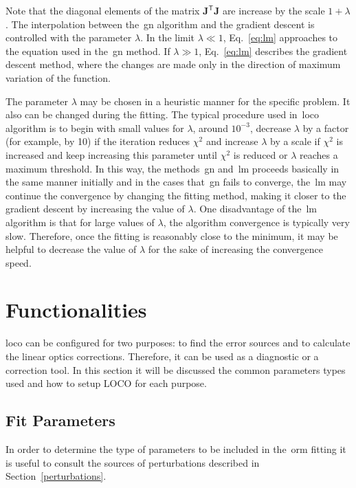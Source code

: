 Note that the diagonal elements of the matrix $\mathbf{J}^{\mathsf{T}}\mathbf{J}$ are increase by the scale $1 + \lambda$. The interpolation between the~\gls{gn} algorithm and the gradient descent is controlled with the parameter $\lambda$. In the limit $\lambda \ll 1$, Eq.~\eqref{eq:lm} approaches to the equation used in the~\gls{gn} method. If $\lambda \gg 1$, Eq.~\eqref{eq:lm} describes the gradient descent method, where the changes are made only in the direction of maximum variation of the function.

The parameter $\lambda$ may be chosen in a heuristic manner for the specific problem. It also can be changed during the fitting. The typical procedure used in~\gls{loco} algorithm \cite{icfa_huang, huang2019beam} is to begin with small values for $\lambda$, around $10^{-3}$, decrease $\lambda$ by a factor (for example, by 10) if the iteration reduces $\chi^2$ and increase $\lambda$ by a scale if $\chi^2$ is increased and keep increasing this parameter until $\chi^2$ is reduced or $\lambda$ reaches a maximum threshold. In this way, the methods~\gls{gn} and~\gls{lm} proceeds basically in the same manner initially and in the cases that~\gls{gn} fails to converge, the~\gls{lm} may continue the convergence by changing the fitting method, making it closer to the gradient descent by increasing the value of $\lambda$. One disadvantage of the~\gls{lm} algorithm is that for large values of $\lambda$, the algorithm convergence is typically very slow. Therefore, once the fitting is reasonably close to the minimum, it may be helpful to decrease the value of $\lambda$ for the sake of increasing the convergence speed.
\section{Functionalities}
\gls{loco} can be configured for two purposes: to find the error sources and to calculate the linear optics corrections. Therefore, it can be used as a diagnostic or a correction tool. In this section it will be discussed the common parameters types used and how to setup LOCO for each purpose.
\subsection{Fit Parameters}\label{subsec:fit_params}
In order to determine the type of parameters to be included in the~\gls{orm} fitting it is useful to consult the sources of perturbations described in Section~\ref{perturbations}.

